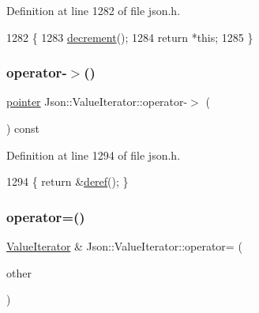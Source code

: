 Definition at line 1282 of file json.\+h.


\begin{DoxyCode}
1282                          \{
1283     \hyperlink{class_json_1_1_value_iterator_base_affc8cf5ff54a9f432cc693362c153fa6}{decrement}();
1284     \textcolor{keywordflow}{return} *\textcolor{keyword}{this};
1285   \}
\end{DoxyCode}
\mbox{\label{class_json_1_1_value_iterator_a8dfc1603f92467591d524d0326f35534}} 
\subsubsection{\texorpdfstring{operator-\/$>$()}{operator->()}}
{\footnotesize\ttfamily \hyperlink{class_json_1_1_value_iterator_acec45feb1ef1f3bf81240157d06d5432}{pointer} Json\+::\+Value\+Iterator\+::operator-\/$>$ (\begin{DoxyParamCaption}{ }\end{DoxyParamCaption}) const\hspace{0.3cm}{\ttfamily [inline]}}



Definition at line 1294 of file json.\+h.


\begin{DoxyCode}
1294 \{ \textcolor{keywordflow}{return} &\hyperlink{class_json_1_1_value_iterator_base_aa5b75c9514a30ba2ea3c9a35c165c18e}{deref}(); \}
\end{DoxyCode}
\mbox{\label{class_json_1_1_value_iterator_a8e23312b1db874f7e403fd7e76611bdc}} 
\subsubsection{\texorpdfstring{operator=()}{operator=()}}
{\footnotesize\ttfamily \hyperlink{class_json_1_1_value_iterator}{Value\+Iterator} \& Json\+::\+Value\+Iterator\+::operator= (\begin{DoxyParamCaption}\item[{const \hyperlink{class_json_1_1_value_iterator_base_a9d2a940d03ea06d20d972f41a89149ee}{Self\+Type} \&}]{other }\end{DoxyParamCaption})}



